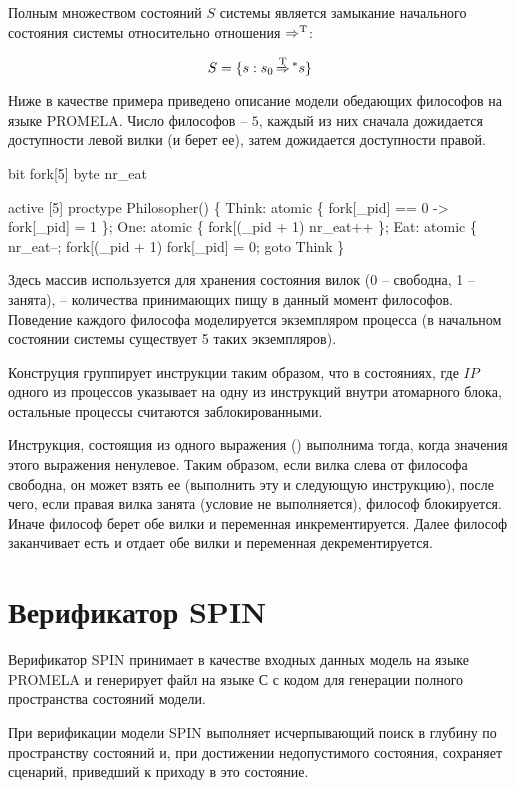 Полным множеством состояний $S$ системы является замыкание начального
состояния системы относительно отношения $\operatorname{\operatorname*{\Rightarrow}^T}$:

\begin{equation}
  \label{eq:statespace-def}
  S = \{s: s_0 \operatorname{\operatorname*{\Rightarrow}^T} \mbox{}^* s\}
\end{equation}

Ниже в качестве примера приведено описание модели обедающих философов
на языке PROMELA. Число философов -- $5$, каждый из них сначала
дожидается доступности левой вилки (и берет ее), затем дожидается
доступности правой.

\begin{CodeBlock}
bit  fork[5]
byte nr_eat

active [5] proctype Philosopher() \{
Think:
  atomic \{ fork[_pid] == 0 -> fork[_pid] = 1 \};
One:
  atomic \{ fork[(_pid + 1)%
           nr_eat++ \};
Eat:
  atomic \{ nr_eat--; fork[(_pid + 1)%
  fork[_pid] = 0;
  goto Think
\}  
\end{CodeBlock}

Здесь массив  используется для хранения состояния вилок (0
-- свободна, 1 -- занята),  -- количества принимающих
пищу в данный момент философов. Поведение каждого философа
моделируется экземпляром процесса  (в начальном
состоянии системы существует 5 таких экземпляров).

Конструция  группирует инструкции таким образом, что
в состояниях, где $IP$ одного из процессов указывает на одну из
инструкций внутри атомарного блока, остальные процессы считаются
заблокированными.

Инструкция, состоящия из одного выражения ()
выполнима тогда, когда значения этого выражения ненулевое. Таким
образом, если вилка слева от философа свободна, он может взять ее
(выполнить эту и следующую инструкцию), после чего, если правая вилка
занята (условие  не выполняется),
философ блокируется. Иначе философ берет обе вилки и переменная
 инкрементируется. Далее философ заканчивает есть и
отдает обе вилки и переменная  декрементируется.

\section{Верификатор SPIN}
\label{sec:spin}

Верификатор SPIN принимает в качестве входных данных модель на языке
PROMELA и генерирует файл на языке С с кодом для генерации полного
пространства состояний модели. 

При верификации модели SPIN выполняет исчерпывающий поиск в глубину по
пространству состояний и, при достижении недопустимого состояния,
сохраняет сценарий, приведший к приходу в это состояние.

